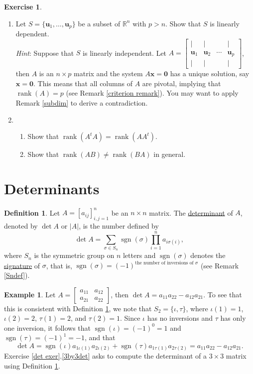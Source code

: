 \documentclass[12pt,letterpaper]{book}
\numberwithin{equation}{section}
\theoremstyle{definition}
\newtheorem{defi}[thm]{\textbf{Definition}}
\newtheorem{example}[thm]{\textbf{Example}}
\newtheorem{exercise}{\textbf{Exercise}}[chapter]
\newcommand{\vu}{\bm{u}}
\newcommand{\vx}{\bm{x}}
\newcommand{\veczero}{\bm{0}}
\newcommand{\rank}{\operatorname{rank}}
\begin{document}
\begin{exercise}
\begin{enumerate}[\bfseries 1.]
\item\label{npdep} Let $S=\{\vu_1,\ldots,\vu_p\}$ be a subset of $\mathbb{R}^n$ with $p>n$. Show that $S$ is linearly dependent. \\
\textit{Hint}: Suppose that $S$ is linearly independent. Let $A=\left[\begin{array}{cccc} | & | &   & | \\ \vu_1 & \vu_2 & \cdots & \vu_p \\ | & | &  & | \end{array}\right]$, then $A$ is an $n\times p$ matrix and the system $A\vx=\veczero$ has a unique solution, say $\vx=\veczero$. This means that all columns of $A$ are pivotal, implying that $\rank(A)=p$ (see Remark \ref{criterion remark}). You may want to apply Remark \ref{subdim} to derive a contradiction.

\item
\begin{enumerate}
\item Show that $\rank(A^tA)=\rank(AA^t)$.
\item Show that $\rank(AB)\neq \rank(BA)$ in general.
\end{enumerate}

\end{enumerate}
\end{exercise}

\section{Determinants}

\begin{defi}\label{detdefi} Let $A=[a_{ij}]_{i,j=1}^n$ be an $n\times n$ matrix. The \underline{determinant} of $A$, denoted by $\det A$ or $|A|$, is the number defined  by
$$\det A=\sum_{\sigma\in S_n} \operatorname{sgn}(\sigma)\prod_{i=1}^n a_{i\sigma(i)},$$ where $S_n$ is the symmetric group on $n$ letters and $\operatorname{sgn}(\sigma)$ denotes the \underline{signature} of $\sigma$, that is, $\operatorname{sgn}(\sigma)=(-1)^{\text{the number of inversions of }\sigma}$ (see Remark \ref{Sndef}).
\end{defi}

\begin{example}\label{2by2det}
Let $A=\left[\begin{array}{rr} a_{11} & a_{12} \\ a_{21}& a_{22} \end{array}\right]$, then $\det A= a_{11}a_{22}-a_{12}a_{21}$. To see that this is consistent with Definition \ref{detdefi}, we note that $S_2=\{\iota, \tau\}$, where $\iota(1)=1$, $\iota(2)=2$, $\tau(1)=2$, and $\tau(2)=1$. Since $\iota$ has no inversions and $\tau$ has only one inversion, it follows that $\operatorname{sgn}(\iota)=(-1)^0=1$ and $\operatorname{sgn}(\tau)=(-1)^1=-1$, and that
$$\det A=\operatorname{sgn}(\iota)a_{1\iota(1)}a_{2\iota(2)}+\operatorname{sgn}(\tau)a_{1\tau(1)}a_{2\tau(2)}= a_{11}a_{22}-a_{12}a_{21}.$$
Exercise \ref{det exer}.\ref{3by3det} asks to compute the determinant of a $3\times 3$ matrix using Definition \ref{detdefi}.
\end{example}
\end{document}
